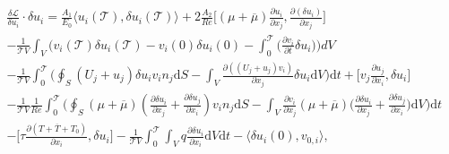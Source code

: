 \documentclass[preprint,12pt]{article}
\begin{document}
\begin{align}\begin{split}
&\frac{\delta \mathcal{L}}{\delta u_i}\cdot \delta u_i=\frac{A_1}{E_0}\Big\langle u_i(\mathcal{T}),\delta u_i(\mathcal{T}) \Big\rangle+2\frac{A_2}{Re}\bigg[(\mu+\overline{\mu})\frac{\partial u_i}{\partial x_j},\frac{\partial (\delta u_i)}{\partial x_j}\bigg]\\&
-\frac{1}{\mathcal{T}V}\int_V\Bigg(v_i(\mathcal{T})\delta u_i(\mathcal{T})-v_i(0)\delta u_i(0)-\int_{0}^{\mathcal{T}}\Bigg(\frac{\partial v_i}{\partial t}\delta u_i\Bigg)\Bigg)dV\\&-\frac{1}{\mathcal{T}V}\int_0^\mathcal{T}\Big(\oint_S(U_j+u_j)\delta u_i v_in_j \text{d}S-\int_V\frac{\partial ((U_j+u_j)v_i)}{\partial x_j}\delta u_i \text{d}V\Big)\text{d}t+\Bigg[v_j\frac{\partial u_j}{\partial x_i},\delta u_i\Bigg]\\&-\frac{1}{\mathcal{T}V}\frac{1}{Re}\int_0^\mathcal{T}\Bigg(\oint_S({\mu}+\overline{\mu})(\frac{\partial \delta u_i}{\partial x_j}+\frac{\partial \delta u_j}{\partial x_i})v_in_j \text{d}S-\int_V\frac{\partial v_i}{\partial x_j}({\mu}+\overline{\mu})\Big(\frac{\partial \delta u_i}{\partial x_j}+\frac{\partial \delta u_j}{\partial x_i}\Big) \text{d}V\Bigg)\text{d}t\\&-\Bigg[\tau\frac{\partial (T+\overline{T}+T_0)}{\partial x_i},\delta u_i\Bigg]-\frac{1}{\mathcal{T}V}\int_0^\mathcal{T}\int_Vq\frac{\partial \delta u_i}{\partial x_i}\text{d}V\text{d}t-\langle \delta u_i(0),v_{0,i}\rangle,\end{split}\end{align}
\end{document}
